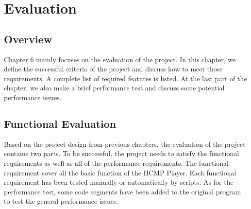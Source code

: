 
\chapter{Evaluation} %



\ifpdf
    \graphicspath{{X/figures/PNG/}{X/figures/PDF/}{X/figures/}}
\else
    \graphicspath{{X/figures/EPS/}{X/figures/}}
\fi


\section{Overview}
Chapter 6 mainly focuses on the evaluation of the project. In
this chapter, we define the successful criteria of the project and discuss
how to meet those requirements. A complete list of required features is
listed. At the last part of the chapter, we also make a brief performance test 
and discuss some potential performance issues.

\section{Functional Evaluation}
Based on the project design from previous chapters, the evaluation of the 
project contains two parts. To be successful, the project needs to satisfy 
the functional requirements as well as all of the performance 
requirements. The functional requirement cover all the basic function of 
the HCMP Player. Each functional requirement has been tested manually or 
automatically by scripts. As for the performance test, some code segments 
have been added to the original program to test the general performance issues.

